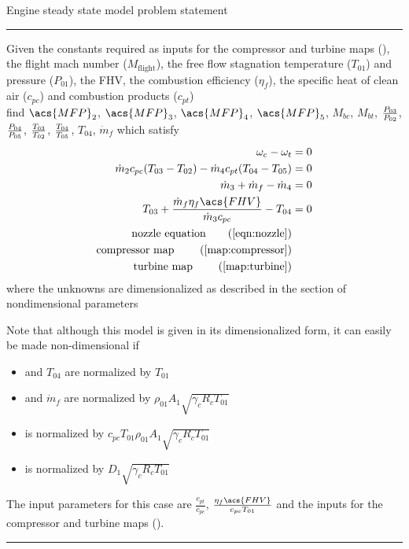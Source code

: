 \begin{table}[b]
\centering
    \caption{Engine steady state model problem statement}
    \label{map:engine}
\begin{minipage}{0.7\textwidth}
    \hrule\vspace{2pt}

    Given the constants required as inputs for the compressor and turbine maps (), 
    the flight mach number ($M_\text{flight}$), the free flow stagnation temperature ($T_{01}$) and pressure ($P_{01}$), 
    the \acf{FHV}, the combustion efficiency ($\eta_f$),
    the specific heat of clean air ($c_{pc}$) and combustion products ($c_{pt}$) \\ 
    find $\acs{MFP}_2$, $\acs{MFP}_3$, $\acs{MFP}_4$, $\acs{MFP}_5$, $M_{bc}$, $M_{bt}$, $\frac{P_{03}}{P_{02}}$, $\frac{P_{04}}{P_{05}}$, $\frac{T_{03}}{T_{02}}$, $\frac{T_{04}}{T_{05}}$, $T_{04}$, $\dot{m}_f$
    which satisfy
\begin{align}
    \omega_c - \omega_t &= 0 \label{eqn:engine:rotation} \\
    \dot{m}_2 c_{pc} (T_{03}-T_{02}) - \dot{m}_4 c_{pt}(T_{04}-T_{05}) &= 0 \label{eqn:engine:energy}\\
    \dot{m}_3 + \dot{m}_f - \dot{m}_4 &= 0 \label{eqn:engine:mass} \\
    T_{03} + \frac{\dot{m}_f \eta_f \acs{FHV}}{\dot{m}_3 c_{pc}} - T_{04} &= 0 \label{eqn:engine:burn} \\
    \text{nozzle equation} \tag{\Cref{eqn:nozzle}} \\
    \text{compressor map } \tag{\Cref{map:compressor}} \\
    \text{turbine map    } \tag{\Cref{map:turbine}}
\end{align}
   where the unknowns are dimensionalized as described in the section of nondimensional parameters

Note that although this model is given in its dimensionalized form, it can easily be made non-dimensional if
\begin{itemize}
    \item {} and $T_{04}$ are normalized by $T_{01}$
    \item {} and $\dot{m}_f$ are normalized by $\rho_{01} A_1 \sqrt{\gamma_c R_c T_{01}}$
    \item {} is normalized by $c_{pc} T_{01} \rho_{01} A_1 \sqrt{\gamma_c R_c T_{01}}$
    \item {} is normalized by $D_1\sqrt{\gamma_c R_c T_{01}}$
\end{itemize}
    The input parameters for this case are $\frac{c_{pt}}{c_{pc}}$, $\frac{\eta_f \acs{FHV}}{c_{pc} T_{01}}$ 
and the inputs for the compressor and turbine maps ().

    \hrule
\end{minipage}
\end{table}


